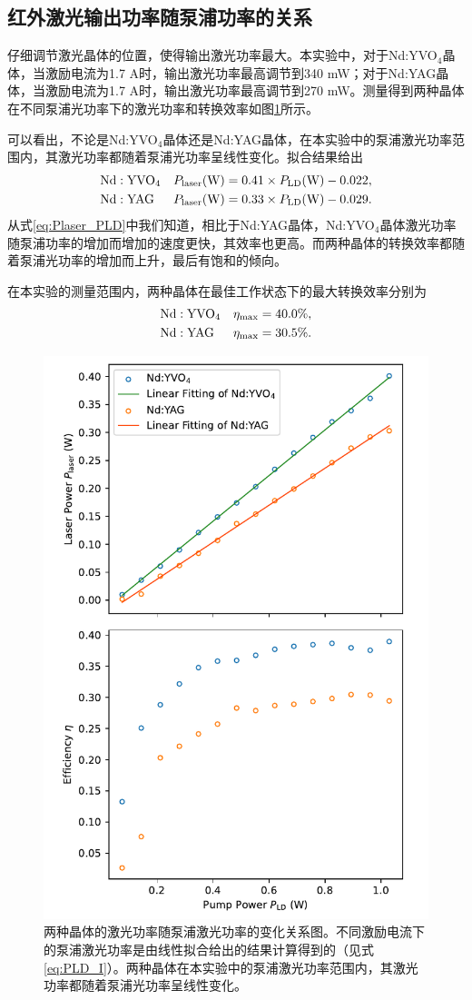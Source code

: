 \documentclass{mpltx}
\begin{document}
\subsection{红外激光输出功率随泵浦功率的关系}
仔细调节激光晶体的位置，使得输出激光功率最大。本实验中，对于Nd:YVO$_4$晶体，当激励电流为1.7 A时，输出激光功率最高调节到340 mW；对于Nd:YAG晶体，当激励电流为1.7 A时，输出激光功率最高调节到270 mW。测量得到两种晶体在不同泵浦光功率下的激光功率和转换效率如图\ref{fig:Plaser_PLD}所示。

可以看出，不论是Nd:YVO$_4$晶体还是Nd:YAG晶体，在本实验中的泵浦激光功率范围内，其激光功率都随着泵浦光功率呈线性变化。拟合结果给出
\begin{equation}\label{eq:Plaser_PLD}
  \begin{aligned}
    &{\rm Nd:YVO_4}&P_{\rm laser}({\rm W})=0.41\times P_{\rm LD}({\rm W})-0.022,\\
    &{\rm Nd:YAG}&P_{\rm laser}({\rm W})=0.33\times P_{\rm LD}({\rm W})-0.029.
  \end{aligned}
\end{equation}
从式\ref{eq:Plaser_PLD}中我们知道，相比于Nd:YAG晶体，Nd:YVO$_4$晶体激光功率随泵浦功率的增加而增加的速度更快，其效率也更高。而两种晶体的转换效率都随着泵浦光功率的增加而上升，最后有饱和的倾向。

在本实验的测量范围内，两种晶体在最佳工作状态下的最大转换效率分别为
\begin{equation}
  \begin{aligned}
    &{\rm Nd:YVO_4}&\eta_{\max}=40.0\%,\\
    &{\rm Nd:YAG}&\eta_{\max}=30.5\%.
  \end{aligned}
\end{equation}
\begin{figure}[h]
  \centering
  \includegraphics[width=0.6\linewidth]{fig/Plaser_PLD.pdf}
  \caption{两种晶体的激光功率随泵浦激光功率的变化关系图。不同激励电流下的泵浦激光功率是由线性拟合给出的结果计算得到的（见式\ref{eq:PLD_I}）。两种晶体在本实验中的泵浦激光功率范围内，其激光功率都随着泵浦光功率呈线性变化。}
  \label{fig:Plaser_PLD}
\end{figure}
\end{document}
